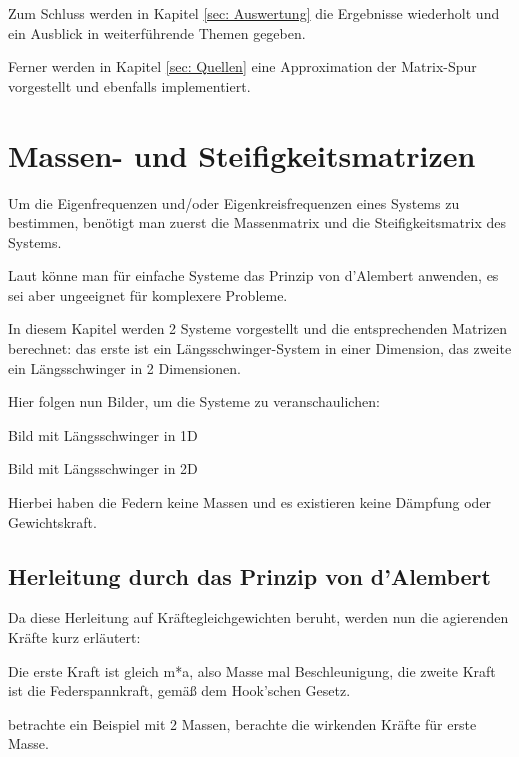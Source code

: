 \documentclass[ngerman,BCOR=4mm]{tudscrreprt}
\theoremstyle{plain} %
\theoremstyle{definition} %
\theoremstyle{remark}
\begin{document}
      Zum Schluss werden in Kapitel \ref{sec: Auswertung} die Ergebnisse wiederholt und ein Ausblick in weiterführende Themen gegeben.

      Ferner werden in Kapitel \ref{sec: Quellen} eine Approximation der Matrix-Spur vorgestellt und ebenfalls implementiert.

\chapter{Massen- und Steifigkeitsmatrizen}
\label{sec: MS Matrizen}
      Um die Eigenfrequenzen und/oder Eigenkreisfrequenzen \w eines Systems zu bestimmen, benötigt man zuerst die Massenmatrix \M und die Steifigkeitsmatrix \K des Systems.

      Laut \cite[S. 366]{maschinendynamikDresig} könne man für einfache Systeme das Prinzip von d'Alembert anwenden, es sei aber ungeeignet für komplexere Probleme.
            
      In diesem Kapitel werden 2 Systeme vorgestellt und die entsprechenden Matrizen berechnet:
      das erste ist ein Längsschwinger-System in einer Dimension, das zweite ein Längsschwinger in 2 Dimensionen.

      Hier folgen nun Bilder, um die Systeme zu veranschaulichen:

      Bild mit Längsschwinger in 1D

      Bild mit Längsschwinger in 2D

      Hierbei haben die Federn keine Massen und es existieren keine Dämpfung oder Gewichtskraft.

      \section{Herleitung durch das Prinzip von d'Alembert}
            Da diese Herleitung auf Kräftegleichgewichten beruht, werden nun die agierenden Kräfte kurz erläutert:

            Die erste Kraft ist gleich m*a, also Masse mal Beschleunigung, die zweite Kraft ist die Federspannkraft, gemäß dem Hook'schen Gesetz.

            betrachte ein Beispiel mit 2 Massen, berachte die wirkenden Kräfte für erste Masse.
\end{document}
